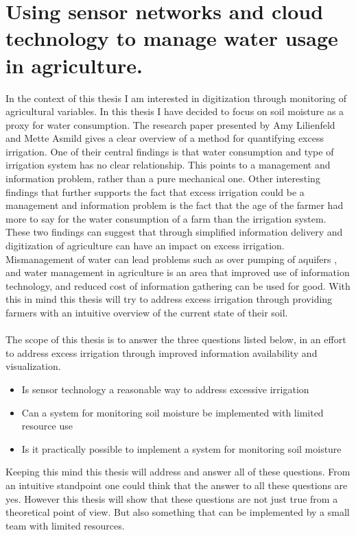 \documentclass[]{uiophd}
\begin{document}
\section{Using sensor networks and cloud technology to manage water usage in agriculture.}

In the context of this thesis I am interested in digitization through monitoring of agricultural variables. In this thesis I have decided to focus on soil moisture as a proxy for water consumption. The research paper presented by Amy Lilienfeld and Mette Asmild \cite{LILIENFELD200773} gives a clear overview of a method for quantifying excess irrigation. One of their central findings is that water consumption and type of irrigation system has no clear relationship. This points to a management and information problem, rather than a pure mechanical one. Other interesting findings that further supports the fact that excess irrigation could be a management and information problem is the fact that the age of the farmer had more to say for the water consumption of a farm than the irrigation system. These two findings can suggest that through simplified information delivery and digitization of agriculture can have an impact on excess irrigation. Mismanagement of water can lead problems such as over pumping of aquifers \cite{LILIENFELD200773}, and water management in agriculture is an area that improved use of information technology, and reduced cost of information gathering can be used for good. With this in mind this thesis will try to address excess irrigation through providing farmers with an intuitive overview of the current state of their soil. 
\\\\
The scope of this thesis is to answer the three questions listed below, in an effort to address excess irrigation through improved information availability and visualization.


\begin{itemize}
  \item Is sensor technology a reasonable way to address excessive irrigation
  \item Can a system for monitoring soil moisture be implemented with limited resource use
  \item Is it practically possible to implement a system for monitoring soil moisture 
\end{itemize}
Keeping this mind this thesis will address and answer all of these questions. From an intuitive standpoint one could think that the answer to all these questions are yes. However this thesis will show that these questions are not just true from a theoretical point of view. But also something that can be implemented by a small team with limited resources.
\end{document}
